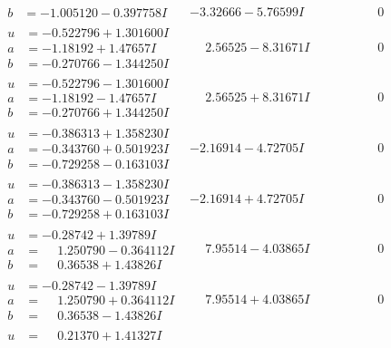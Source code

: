 \documentclass[1p]{elsarticle_modified}
\theoremstyle{definition}
\begin{document}
$$\begin{array}{c|c|c}
\begin{aligned}
b &= -1.005120 - 0.397758 I\end{aligned}
 & -3.32666 - 5.76599 I & \phantom{-0.000000 } 0 \\ \hline\begin{aligned}
u &= -0.522796 + 1.301600 I \\
a &= -1.18192 + 1.47657 I \\
b &= -0.270766 - 1.344250 I\end{aligned}
 & \phantom{-}2.56525 - 8.31671 I & \phantom{-0.000000 } 0 \\ \hline\begin{aligned}
u &= -0.522796 - 1.301600 I \\
a &= -1.18192 - 1.47657 I \\
b &= -0.270766 + 1.344250 I\end{aligned}
 & \phantom{-}2.56525 + 8.31671 I & \phantom{-0.000000 } 0 \\ \hline\begin{aligned}
u &= -0.386313 + 1.358230 I \\
a &= -0.343760 + 0.501923 I \\
b &= -0.729258 - 0.163103 I\end{aligned}
 & -2.16914 - 4.72705 I & \phantom{-0.000000 } 0 \\ \hline\begin{aligned}
u &= -0.386313 - 1.358230 I \\
a &= -0.343760 - 0.501923 I \\
b &= -0.729258 + 0.163103 I\end{aligned}
 & -2.16914 + 4.72705 I & \phantom{-0.000000 } 0 \\ \hline\begin{aligned}
u &= -0.28742 + 1.39789 I \\
a &= \phantom{-}1.250790 - 0.364112 I \\
b &= \phantom{-}0.36538 + 1.43826 I\end{aligned}
 & \phantom{-}7.95514 - 4.03865 I & \phantom{-0.000000 } 0 \\ \hline\begin{aligned}
u &= -0.28742 - 1.39789 I \\
a &= \phantom{-}1.250790 + 0.364112 I \\
b &= \phantom{-}0.36538 - 1.43826 I\end{aligned}
 & \phantom{-}7.95514 + 4.03865 I & \phantom{-0.000000 } 0 \\ \hline\begin{aligned}
u &= \phantom{-}0.21370 + 1.41327 I \\

\end{aligned}
\end{array}$$
\end{document}
